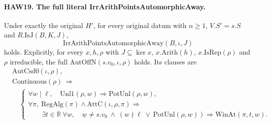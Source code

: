 \paragraph{HAW19. The full literal IrrArithPointsAutomorphicAway.}
\label{claim:HAW19}
Under exactly the original $H'$, for every original datum
with $n\ge1$, $V.S'=s.S$ and $R.\mathrm{IsJ}(B,K,J)$,
\[
              \mathrm{IrrArithPointsAutomorphicAway}(B,\iota,J)
 \tag{HAW.30}
\]
holds.  Explicitly, for every $x,h,\rho$ with
$J\subseteq\ker x$, $x.\mathrm{Arith}(h)$,
$x.\mathrm{IsRep}(\rho)$ and $\rho$ irreducible, the full
$\mathrm{AutOffN}(s.v_0,\iota,\rho)$ holds.  Its clauses are
\[
 \begin{split}
 &\mathrm{AutCsd0}(\iota,\rho),\\
 &\mathrm{Continuous}(\rho)\ \Longrightarrow\\
 &\quad\left\{\begin{array}{l}
     \forall w\mid\ell,\quad
       \mathrm{Unl1}(\rho,w)\Longrightarrow\mathrm{PotUnl}(\rho,w),\\
     \forall\pi,\ \mathrm{RegAlg}(\pi)\land
                  \mathrm{AttC}(\iota,\rho,\pi)\Longrightarrow\\
     \qquad\exists t\in\mathbb R\ \forall w,\quad
     \underline w\ne s.v_0\ \land\
       (w\nmid\ell\ \lor\ \mathrm{PotUnl}(\rho,w))
          \Longrightarrow\mathrm{WinAt}(\pi,t,w).
   \end{array}\right.
 \end{split}
 \tag{HAW.31}
\]
